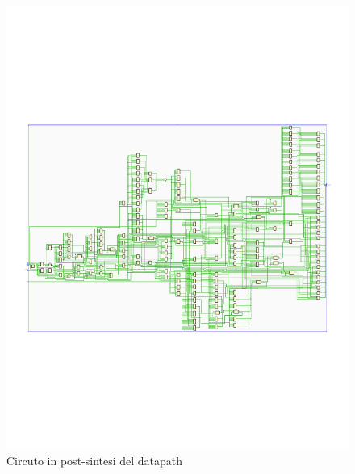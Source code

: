 \documentclass[12pt]{article} %
\begin{document}
			\begin{figure}[H]
				\centering
				\includegraphics[width=1.1\textwidth]{PostSynthesis_DataPath_Schematic.pdf}
				\caption{Circuto in post-sintesi del datapath}
				\label{fig:Schematic_PostSynthesis_DataPath}
			\end{figure}
\end{document}
